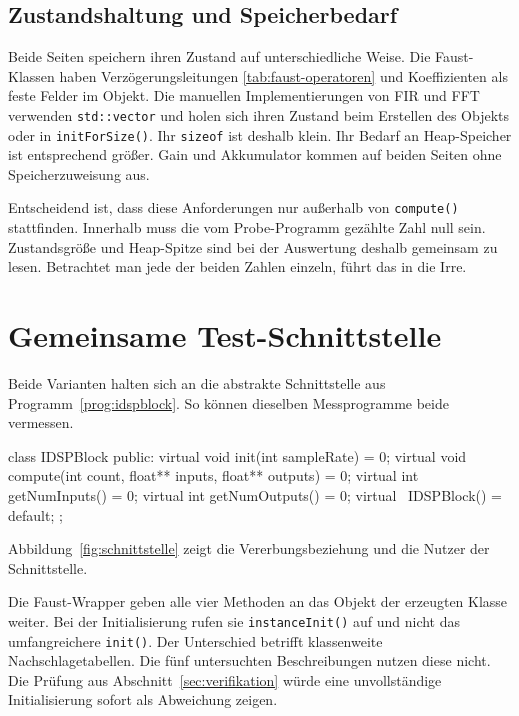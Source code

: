 \subsection{Zustandshaltung und Speicherbedarf}
\label{subsec:zustand}

Beide Seiten speichern ihren Zustand auf unterschiedliche Weise. Die Faust-Klassen haben Verzögerungsleitungen \ref{tab:faust-operatoren} und Koeffizienten als feste Felder im Objekt. Die manuellen Implementierungen von FIR und FFT verwenden \texttt{std::vector} und holen sich ihren Zustand beim Erstellen des Objekts oder in \texttt{initForSize()}. Ihr \texttt{sizeof} ist deshalb klein. Ihr Bedarf an Heap-Speicher ist entsprechend größer. Gain und Akkumulator kommen auf beiden Seiten ohne Speicherzuweisung aus.

Entscheidend ist, dass diese Anforderungen nur außerhalb von \texttt{compute()} stattfinden. Innerhalb muss die vom Probe-Programm gezählte Zahl null sein. Zustandsgröße und Heap-Spitze sind bei der Auswertung deshalb gemeinsam zu lesen. Betrachtet man jede der beiden Zahlen einzeln, führt das in die Irre.

\section{Gemeinsame Test-Schnittstelle}
\label{sec:schnittstelle}

Beide Varianten halten sich an die abstrakte Schnittstelle aus Programm~\ref{prog:idspblock}. So können dieselben Messprogramme beide vermessen.

\begin{program}
	\caption{Die gemeinsame Schnittstelle \texttt{IDSPBlock}}
	\label{prog:idspblock}
	\begin{CCode}
		class IDSPBlock {
			public:
			virtual void init(int sampleRate) = 0;
			virtual void compute(int count, float** inputs, float** outputs) = 0;
			virtual int  getNumInputs() = 0;
			virtual int  getNumOutputs() = 0;
			virtual ~IDSPBlock() = default;
		};
	\end{CCode}
\end{program}

Abbildung~\ref{fig:schnittstelle} zeigt die Vererbungsbeziehung und die Nutzer der Schnittstelle.



Die Faust-Wrapper geben alle vier Methoden an das Objekt der erzeugten Klasse weiter. Bei der Initialisierung rufen sie \texttt{instanceInit()} auf und nicht das umfangreichere \texttt{init()}. Der Unterschied betrifft klassenweite Nachschlagetabellen. Die fünf untersuchten Beschreibungen nutzen diese nicht. Die Prüfung aus Abschnitt~\ref{sec:verifikation} würde eine unvollständige Initialisierung sofort als Abweichung zeigen.

